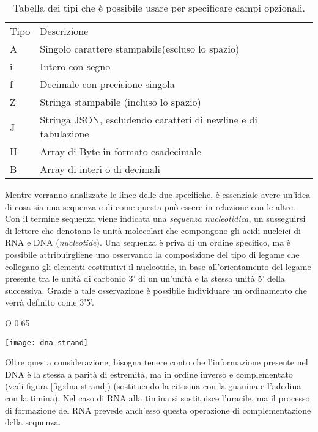 \noindent
\begin{table}[h]
	\begin{tabularx}{\textwidth}{ | X | l | }
		\hline
		Tipo	&	Descrizione\\
		A 		&	Singolo carattere stampabile(escluso lo spazio)\\
		i 		&	Intero con segno\\
		f 		&	Decimale con precisione singola\\
		Z		&	Stringa stampabile (incluso lo spazio)\\
		J		&	Stringa JSON, escludendo caratteri di newline e di tabulazione\\
		H 		&	Array di Byte in formato esadecimale\\
		B 		&	Array di interi o di decimali\\
		\hline
	\end{tabularx}
	\caption{Tabella dei tipi che è possibile usare per specificare campi opzionali.}
	\label{tab:optfield-type}
\end{table}

Mentre verranno analizzate le linee delle due specifiche, è essenziale
avere un'idea di cosa sia una sequenza e di come questa può essere in
relazione con le altre.
Con il termine sequenza viene indicata una \emph{sequenza nucleotidica},
un susseguirsi di lettere che denotano le unità molecolari che compongono
gli acidi nucleici di RNA e DNA (\emph{nucleotide}).
Una sequenza è priva di un ordine specifico, ma è possibile attribuirgliene
uno osservando la composizione del tipo di legame che collegano
gli elementi costitutivi il nucleotide, in base all'orientamento del
legame presente tra le unità di carbonio 3' di un un'unità
e la stessa unità 5' della successiva. Grazie a tale osservazione
è possibile individuare un ordinamento che verrà definito
come 3'5'.

\begin{wrapfigure} {O} {0.65\textwidth}
        \begin{centering}
                \texttt{[image: dna-strand]}
                \caption[Rappresentazione del DNA]{Rappresentazione grafica degli strand che compongono il DNA.}
                \label{fig:dna-strand}
        \end{centering}
\end{wrapfigure}

Oltre questa considerazione, bisogna tenere conto che
l'informazione presente nel DNA
è la stessa a parità di estremità, ma in ordine inverso e
complementato (vedi figura \ref{fig:dna-strand}) (sostituendo
la citosina con la guanina e
l'adedina con la timina). Nel caso di RNA alla timina
si sostituisce l'uracile, ma il processo di formazione del RNA
prevede anch'esso questa operazione di complementazione
della sequenza.


